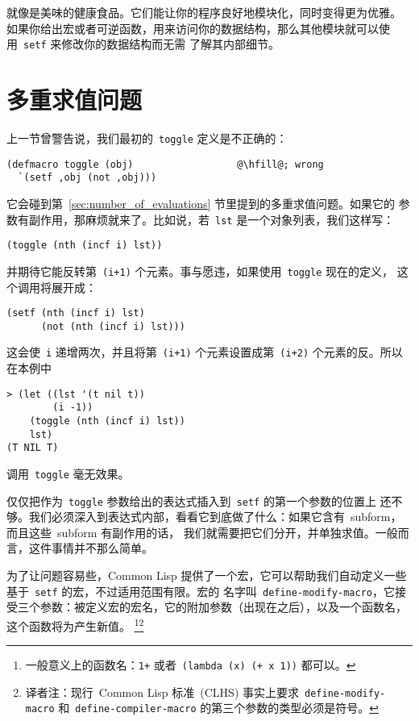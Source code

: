 \gv{}就像是美味的健康食品。它们能让你的程序良好地模块化，同时变得更为优雅。
如果你给出宏或者可逆函数，用来访问你的数据结构，那么其他模块就可以使用~\verb|setf| 来修改你的数据结构而无需
了解其内部细节。

\section{多重求值问题}
\label{sec:the_multiple_evaluation_problem}

上一节曾警告说，我们最初的~\verb|toggle| 定义是不正确的：
\begin{lstlisting}[escapechar=\@]
(defmacro toggle (obj)                  @\hfill@; wrong
  `(setf ,obj (not ,obj)))
\end{lstlisting}
它会碰到第~\ref{sec:number_of_evaluations} 节里提到的多重求值问题。如果它的
参数有副作用，那麻烦就来了。比如说，若~\verb|lst| 是一个对象列表，我们这样写：
\begin{lstlisting}
(toggle (nth (incf i) lst))
\end{lstlisting}
并期待它能反转第~\verb|(i+1)| 个元素。事与愿违，如果使用~\verb|toggle| 现在的定义，
这个调用将展开成：
\begin{lstlisting}
(setf (nth (incf i) lst)
      (not (nth (incf i) lst)))
\end{lstlisting}
这会使~\verb|i| 递增两次，并且将第~\verb|(i+1)| 个元素设置成第~\verb|(i+2)|
个元素的反。所以在本例中
\begin{lstlisting}
> (let ((lst '(t nil t))
        (i -1))
    (toggle (nth (incf i) lst))
    lst)
(T NIL T)
\end{lstlisting}
调用~\verb|toggle| 毫无效果。

仅仅把作为~\verb|toggle| 参数给出的表达式插入到~\verb|setf| 的第一个参数的位置上
还不够。我们必须深入到表达式内部，看看它到底做了什么：如果它含有~subform，而且这些~subform 有副作用的话，
我们就需要把它们分开，并单独求值。一般而言，这件事情并不那么简单。

为了让问题容易些，Common Lisp 提供了一个宏，它可以帮助我们自动定义一些基于~\verb|setf| 的宏，不过适用范围有限。宏的
名字叫~\verb|define-modify-macro|，它接受三个参数：被定义宏的宏名，它的附加参数（出现在\gv{}之后），以及一个函数名，这个函数将为\gv{}产生新值。
\footnote{一般意义上的函数名：\texttt{1+} 或者~\texttt{(lambda (x) (+ x 1))} 都可以。}\footnote{译者注：现行~Common Lisp 标准~(\textsc{CLHS}) 事实上要求~\texttt{define-modify-macro} 和~\texttt{define-compiler-macro} 的第三个参数的类型必须是符号。}

